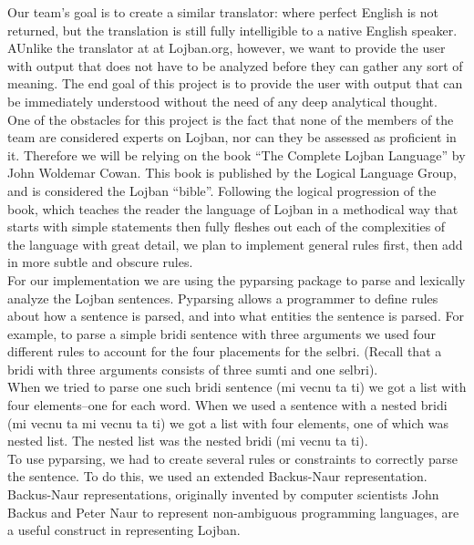 \documentclass[11pt,letterpaper]{article}
\begin{document}
	Our team’s goal is to create a similar translator:  where  perfect English is not returned, but the translation is still fully intelligible to a native English speaker. AUnlike the translator at  at Lojban.org, however, we want to provide the user with output that does not have to be analyzed before they can gather any sort of meaning. The end goal of this project is to provide the user with output that can be immediately understood without the need of any deep analytical thought.\\

	One of the obstacles for this project is the fact that none of the members of the team are considered experts on Lojban, nor can they be assessed as proficient in it. Therefore we will be relying on the book “The Complete Lojban Language” by John Woldemar Cowan. This book is published by the Logical Language Group, and is considered the Lojban “bible”. Following the logical progression of the book, which teaches the reader the language of Lojban in a methodical way that starts with simple statements then fully fleshes out each of the complexities of the language with great detail, we plan to implement general rules first, then add in more subtle and obscure rules. \\

	For our implementation we are using the pyparsing package to parse and lexically analyze the Lojban sentences.  Pyparsing allows a programmer to define rules about how a sentence is parsed, and into what entities the sentence is parsed. For example, to parse a simple  bridi sentence with three arguments we used four different rules to account for the four placements for the selbri. (Recall that a bridi with three arguments consists of three sumti and one selbri). \\

	When we tried to parse one such bridi sentence (mi vecnu ta ti) we got a list with four elements--one for each word. When we used a sentence with a nested bridi (mi vecnu ta mi vecnu ta ti) we got a list with four elements, one of which was nested list. The nested list was the nested bridi (mi vecnu ta ti). \\

	To use pyparsing, we had to create several rules or constraints to correctly parse the sentence. To do this, we used an extended Backus-Naur representation. Backus-Naur representations, originally invented by computer scientists John Backus and Peter Naur to represent non-ambiguous programming languages, are a useful construct in representing Lojban.\\
\end{document}
